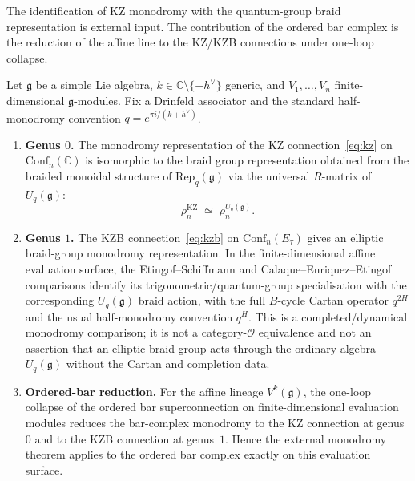 The identification of KZ monodromy with the quantum-group braid
representation is external input. The contribution of the ordered
bar complex is the reduction of the affine line to the KZ/KZB
connections under one-loop collapse.

\begin{theorem}
\label{thm:drinfeld-kohno}
Let $\mathfrak{g}$ be a simple Lie algebra, $k \in \mathbb{C}
\setminus \{-h^\vee\}$ generic, and $V_1, \dots, V_n$
finite-dimensional $\mathfrak{g}$-modules. Fix a Drinfeld associator
and the standard half-monodromy convention
$q=e^{\pi i/(k+h^\vee)}$.
\begin{enumerate}[label=\textup{(\roman*)}]
\item \textbf{Genus $0$.}
The monodromy representation of the KZ
connection~\eqref{eq:kz} on $\mathrm{Conf}_n(\mathbb{C})$
is isomorphic to the braid group representation obtained from the
braided monoidal structure of $\mathrm{Rep}_q(\mathfrak{g})$
via the universal $R$-matrix of $U_q(\mathfrak{g})$:
\begin{equation}\label{eq:dk}
\rho_n^{\mathrm{KZ}}
\;\simeq\;
\rho_n^{U_q(\mathfrak{g})}.
\end{equation}

\item \textbf{Genus $1$.}
The KZB connection~\eqref{eq:kzb} on
$\mathrm{Conf}_n(E_\tau)$ gives an elliptic braid-group
monodromy representation. In the finite-dimensional affine
evaluation surface, the Etingof--Schiffmann and
Calaque--Enriquez--Etingof comparisons identify its
trigonometric/quantum-group specialisation with the corresponding
$U_q(\mathfrak g)$ braid action, with the full $B$-cycle Cartan
operator $q^{2H}$ and the usual half-monodromy convention $q^H$.
This is a completed/dynamical monodromy comparison; it is not a
category-$\mathcal O$ equivalence and not an assertion that an
elliptic braid group acts through the ordinary algebra
$U_q(\mathfrak g)$ without the Cartan and completion data.

\item \textbf{Ordered-bar reduction.}
For the affine lineage $V^k(\mathfrak g)$, the one-loop collapse of
the ordered bar superconnection on finite-dimensional evaluation
modules reduces the bar-complex monodromy to the KZ connection at
genus~$0$ and to the KZB connection at genus~$1$. Hence the
external monodromy theorem applies to the ordered bar complex exactly
on this evaluation surface.
\end{enumerate}
\end{theorem}

